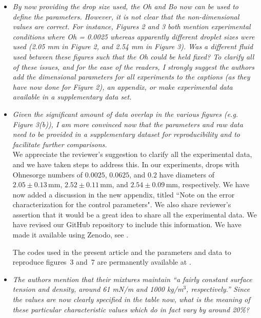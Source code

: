 \documentclass[]{article}
\newcommand{\oo}{\color{magenta} \normalfont}
\newcommand{\bb}{\color{black} \normalfont}
\begin{document}
\begin{enumerate}
\begin{itemize}
		\item \textit{By now providing the drop size used, the Oh and Bo now can be used to define the parameters. However, it is not clear that the non-dimensional values are correct. For instance, Figures 2 and 3 both mention experimental conditions where Oh = 0.0025 whereas apparently different droplet sizes were used (2.05 mm in Figure 2, and 2.54 mm in Figure 3). Was a different fluid used between these figures such that the Oh could be held fixed? To clarify all of these issues, and for the ease of the readers, I strongly suggest the authors add the dimensional parameters for all experiments to the captions (as they have now done for Figure 2), an appendix, or make experimental data available in a supplementary data set.}	
		
		\item \textit{Given the significant amount of data overlap in the various figures (e.g. Figure 3(b)), I am more convinced now that the parameters and raw data need to be provided in a supplementary dataset for reproducibility and to facilitate further comparisons.}\\[1mm]
		
		We appreciate the reviewer's suggestion to clarify all the experimental data, and we have taken steps to address this. In our experiments, drops with Ohnesorge numbers of $0.0025$, $0.0625$, and $0.2$ have diameters of $2.05 \pm 0.13\,\si{\milli\meter}$, $2.52 \pm 0.11\,\si{\milli\meter}$, and $2.54 \pm 0.09\,\si{\milli\meter}$, respectively. We have now added a discussion in the new appendix, titled ``Note on the error characterization for the control parameters". 
		We also share reviewer's assertion that it would be a great idea to share all the experimental data. We have revised our GitHub repository to include this information. We have made it available using Zenodo, see \citet{basiliskVatsal}.
		
		\oo
		 The codes used in the present article and the parameters and data to reproduce figures~3 and~7 are permanently available at \citet{basiliskVatsal}.\\
		\bb
		
		\item \textit{The authors mention that their mixtures maintain ``a fairly constant surface tension and density, around 61 mN/m and 1000 kg/m$^3$, respectively.'' Since the values are now clearly specified in the table now, what is the meaning of these particular characteristic values which do in fact vary by around 20\%?}\\[1mm]
		

\end{itemize}
\end{enumerate}
\end{document}
